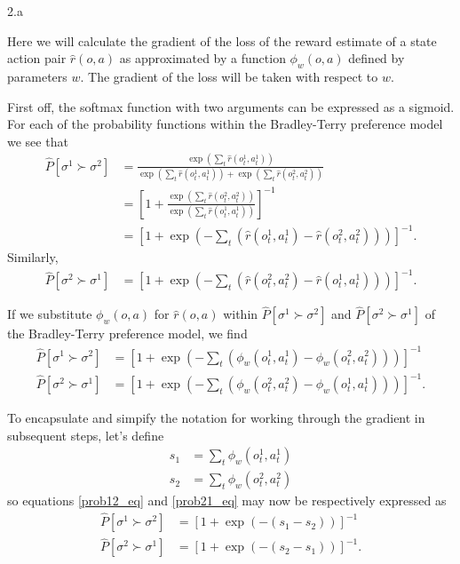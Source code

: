\LARGE
2.a
\normalsize
\begin{answer}
  Here we will calculate the gradient of the loss of the reward estimate of a state action pair $\hat{r}(o, a)$ as approximated by a 
  function $\phi_{w}(o,a)$ defined by parameters $w$. The gradient of the loss will be taken with respect to $w$.
  
  First off, the softmax function with two arguments can be expressed as a 
  sigmoid.  For each of the probability functions within the Bradley-Terry preference model we see that
  \begin{align}
    \hat{P}[\sigma^{1} \succ \sigma^{2}] &= \frac{\exp(\sum_{t} \hat{r}(o^{1}_{t}, a^{1}_{t}))}{\exp(\sum_{t} \hat{r}(o^{1}_{t}, a^{1}_{t})) + \exp(\sum_{t} \hat{r}(o^{2}_{t}, a^{2}_{t}))} \\
    &= \left[1 + \frac{\exp(\sum_{t} \hat{r}(o^{2}_{t}, a^{2}_{t}))}{\exp(\sum_{t} \hat{r}(o^{1}_{t}, a^{1}_{t}))}\right]^{-1} \\
    &= \left[1 + \exp(-\sum_{t}(\hat{r}(o^{1}_{t}, a^{1}_{t}) - \hat{r}(o^{2}_{t}, a^{2}_{t})))\right]^{-1}.
  \end{align}
  Similarly,
  \begin{align}
    \hat{P}[\sigma^{2} \succ \sigma^{1}] &= \left[1 + \exp(-\sum_{t}(\hat{r}(o^{2}_{t}, a^{2}_{t}) - \hat{r}(o^{1}_{t}, a^{1}_{t})))\right]^{-1}.
  \end{align}

  If we substitute $\phi_{w}(o, a)$ for $\hat{r}(o, a)$ within  $\hat{P}[\sigma^{1} \succ \sigma^{2}]$ and $\hat{P}[\sigma^{2} \succ \sigma^{1}]$ of the Bradley-Terry preference model, we find
  \begin{align}
    \hat{P}[\sigma^{1} \succ \sigma^{2}] &= \left[1 + \exp(-\sum_{t}(\phi_{w}(o^{1}_{t}, a^{1}_{t}) - \phi_{w}(o^{2}_{t}, a^{2}_{t})))\right]^{-1}\label{prob12_eq} \\
    \hat{P}[\sigma^{2} \succ \sigma^{1}] &= \left[1 + \exp(-\sum_{t}(\phi_{w}(o^{2}_{t}, a^{2}_{t}) - \phi_{w}(o^{1}_{t}, a^{1}_{t})))\right]^{-1}\label{prob21_eq}.
  \end{align}

  To encapsulate and simpify the notation for working through the gradient in subsequent steps, let's define
  \begin{align}
    s_{1} &= \sum_{t}\phi_{w}(o^{1}_{t}, a^{1}_{t})\label{s1_eq} \\
    s_{2} &= \sum_{t}\phi_{w}(o^{2}_{t}, a^{2}_{t})\label{s2_eq}
  \end{align}
  so equations \ref{prob12_eq} and \ref{prob21_eq} may now be respectively expressed as
  \begin{align}
    \hat{P}[\sigma^{1} \succ \sigma^{2}] &= \left[1 + \exp(-(s_{1} - s_{2}))\right]^{-1}\label{p12_eq} \\
    \hat{P}[\sigma^{2} \succ \sigma^{1}] &= \left[1 + \exp(-(s_{2} - s_{1}))\right]^{-1}.
  \end{align}


\end{answer}

